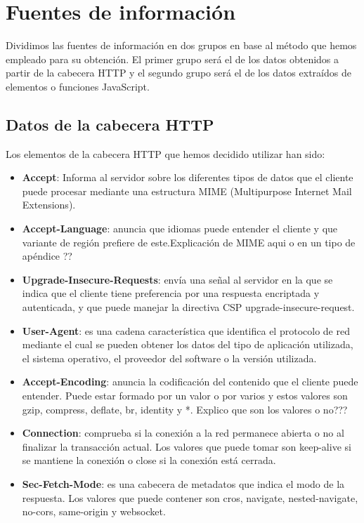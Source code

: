 \chapter{Fuentes de información}
\noindent
Dividimos las fuentes de información en dos grupos en base al método que hemos empleado para su obtención. El primer grupo será el de los datos obtenidos a partir de la cabecera HTTP y el segundo grupo será el de los datos extraídos de elementos o funciones JavaScript.
\section{Datos de la cabecera HTTP}
Los elementos de la cabecera HTTP que hemos decidido utilizar han sido:
\begin{itemize}
    \item \textbf{Accept}: Informa al servidor sobre los diferentes tipos de datos que el cliente puede procesar mediante una estructura MIME (Multipurpose Internet Mail Extensions).
    \item \textbf{Accept-Language}: anuncia que idiomas puede entender el cliente y que variante de región prefiere de este.Explicación de MIME aqui o en un tipo de apéndice ??
    \item \textbf{Upgrade-Insecure-Requests}: envía una señal al servidor en la que se indica que el cliente tiene preferencia por una respuesta encriptada y autenticada, y que puede manejar la directiva CSP upgrade-insecure-request.
    \item \textbf{User-Agent}: es una cadena característica que identifica el protocolo de red mediante el cual se pueden obtener los datos del tipo de aplicación utilizada, el sistema operativo, el proveedor del software o la versión utilizada.
    \item \textbf{Accept-Encoding}: anuncia la codificación del contenido que el cliente puede entender. Puede estar formado por un valor o por varios y estos valores son gzip, compress, deflate, br, identity y *. Explico que son los valores o no???
    \item \textbf{Connection}: comprueba si la conexión a la red permanece abierta o no al finalizar la transacción actual. Los valores que puede tomar son keep-alive si se mantiene la conexión o close si la conexión está cerrada.
    \item \textbf{Sec-Fetch-Mode}: es una cabecera de metadatos que indica el modo de la respuesta. Los valores que puede contener son cros, navigate, nested-navigate, no-cors, same-origin y websocket.

\end{itemize}
